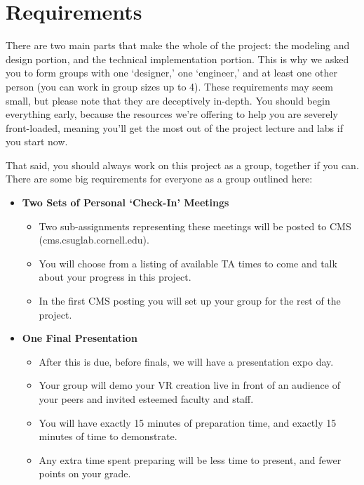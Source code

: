 \documentclass[12pt]{article}
\begin{document}
\section{Requirements}

There are two main parts that make the whole of the project: the modeling and design portion, and the technical implementation portion.  This is why we asked you to form groups with one ‘designer,’ one ‘engineer,’ and at least one other person (you can work in group sizes up to 4).  These requirements may seem small, but please note that they are deceptively in-depth.  You should begin everything early, because the resources we’re offering to help you are severely front-loaded, meaning you’ll get the most out of the project lecture and labs if you start now.

That said, you should always work on this project as a group, together if you can.  There are some big requirements for everyone as a group outlined here:

\begin{itemize}

	\item \textbf{Two Sets of Personal ‘Check-In’ Meetings}
	\begin{itemize}
	
		\item Two sub-assignments representing these meetings will be posted to CMS (cms.csuglab.cornell.edu).
		\item You will choose from a listing of available TA times to come and talk about your progress in this project.
		\item In the first CMS posting you will set up your group for the rest of the project.
	
	\end{itemize}
	\item \textbf{One Final Presentation}
	\begin{itemize}
		\item After this is due, before finals, we will have a presentation expo day.
		\item Your group will demo your VR creation live in front of an audience of your peers and invited esteemed faculty and staff.
		\item You will have exactly 15 minutes of preparation time, and exactly 15 minutes of time to demonstrate.  
		\item Any extra time spent preparing will be less time to present, and fewer points on your grade.
	\end{itemize}
	

\end{itemize}
\end{document}
